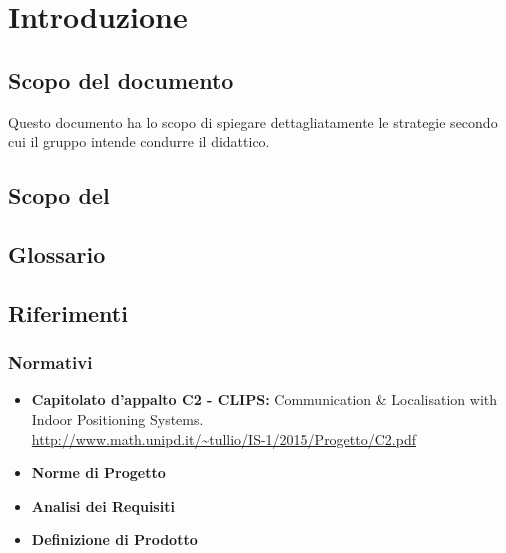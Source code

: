 \section{Introduzione}
\label{introduzione}
\subsection{Scopo del documento} 
Questo documento ha lo scopo di spiegare dettagliatamente le strategie secondo cui il gruppo \AUTORE{} intende condurre il  didattico. 
\subsection{Scopo del }
\SCOPO
\subsection{Glossario}
\GLOSSARIO
\subsection{Riferimenti}
\subsubsection{Normativi}
\begin{itemize}
	\item \textbf{Capitolato d'appalto C2 - CLIPS:} Communication \& Localisation with Indoor Positioning Systems. \\
	\url{http://www.math.unipd.it/~tullio/IS-1/2015/Progetto/C2.pdf}
	\item \textbf{Norme di Progetto} \\ \NPdoc
	\item \textbf{Analisi dei Requisiti} \\ \ARdoc
	\item \textbf{Definizione di Prodotto} \\ \DPdoc
\end{itemize}	

